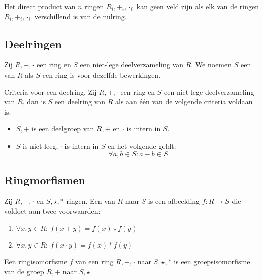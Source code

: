 \documentclass[main.tex]{subfiles}
\begin{document}
\begin{st}
  Het direct product van $n$ ringen $R_{i},+_{i},\cdot_{i}$ kan geen veld zijn als elk van de ringen $R_{i},+_{i},\cdot_{i}$ verschillend is van de nulring.
\end{st}

\subsection{Deelringen}
\label{sec:deelringen}

\begin{de}
  Zij $R,+,\cdot$ een ring en $S$ een niet-lege deelverzameling van $R$.
  We noemen $S$ een  van $R$ als $S$ een ring is voor dezelfde bewerkingen.
\end{de}

\begin{st}
  \label{st:deelring-criteria}
  Criteria voor een deelring.
  Zij $R,+,\cdot$ een ring en $S$ een niet-lege deelverzameling van $R$, dan is $S$ een deelring van $R$ als aan \'e\'en van de volgende criteria voldaan is.
  \begin{itemize}
  \item $S,+$ is een deelgroep van $R,+$ en $\cdot$ is intern in $S$.
  \item $S$ is niet leeg, $\cdot$ is intern in $S$ en het volgende geldt:
    \[ \forall a,b \in S: a - b \in S \]
  \end{itemize}
\end{st}

\subsection{Ringmorfismen}
\label{sec:ringmorfismen}

\begin{de}
  Zij $R,+,\cdot$ en $S,\star,*$ ringen.
  Een  van $R$ naar $S$ is een afbeelding $f: R\rightarrow S$ die voldoet aan twee voorwaarden:
  \begin{enumerate}
  \item $\forall x,y \in R:\ f(x + y) = f(x) \star f(y)$
  \item $\forall x,y \in R:\ f(x \cdot y) = f(x) * f(y)$
  \end{enumerate}
\end{de}

\begin{opm}
  Een ringisomorfisme $f$ van een ring $R,+,\cdot$ naar $S,\star,*$ is een groepsisomorfisme van de groep $R,+$ naar $S,\star$
\end{opm}
\end{document}
